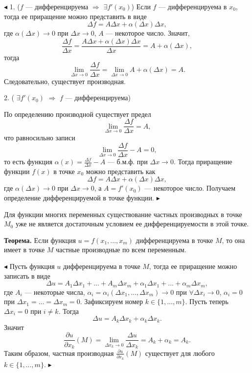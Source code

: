 \documentclass[12pt]{article}
\begin{document}
$\blacktriangleleft$ 1. ($f$ --- дифференцируема $\Rightarrow$ $\exists f'(x_0)$) Если $f$ --- дифференцируема в $x_0$, тогда ее приращение можно представить в виде 
$$
	\Delta f = A\Delta x + \alpha(\Delta x) \Delta x,
$$
где $\alpha(\Delta x) \rightarrow 0$ при $\Delta x \rightarrow 0$, $A$ --- некоторое число.
Значит, 
$$
	\frac{\Delta f}{\Delta x} = \frac{A\Delta x + \alpha(\Delta x) \Delta x}{\Delta x} = A + \alpha(\Delta x),
$$
тогда
$$
	\lim_{\Delta x \rightarrow 0} \frac{\Delta f}{\Delta x} = \lim_{\Delta x \rightarrow 0} A + \alpha(\Delta x) = A.
$$
Следовательно, существует производная. 


2. ( $\exists f'(x_0)$ $\Rightarrow$ $f$ --- дифференцируема)

По определению производной существует предел
$$
	\lim_{\Delta x \rightarrow 0} \frac{\Delta f}{\Delta x} = A,
$$
что равносильно записи
$$
	\lim_{\Delta x \rightarrow 0} \frac{\Delta f}{\Delta x} - A = 0,
$$
то есть функция $\alpha(x) = \frac{\Delta f}{\Delta x} - A$ --- б.м.ф. при $\Delta x \rightarrow 0$. Тогда приращение функции $f(x)$ в точке $x_0$ можно представить как
$$
	\Delta f = A \Delta x + \alpha(\Delta x) \Delta x, 
$$
где $\alpha(\Delta x) \rightarrow 0$ при $\Delta x \rightarrow 0$, а $A = f'(x_0)$ --- некоторое число. Получаем определение дифференцируемой в точке функции. $\blacktriangleright$

Для функции многих переменных существование частных производных в точке $M_0$ уже не является достаточным условием ее дифференцируемости в этой точке.

\textbf{Теорема.} Если функция $u = f(x_1,...,x_m)$ дифференцируема в точке $M$, то она имеет в точке $M$ частные производные по всем переменным.

$\blacktriangleleft$ Пусть функция $u$ дифференцируема в точке $M$, тогда ее приращение можно записать в виде
$$
	\Delta u = A_1\Delta x_1 + ...+ A_m \Delta x_m + \alpha_1 \Delta x_1 + ... + \alpha_m \Delta x_m,
$$
где $A_i$ --- некоторые числа, $\alpha_i = \alpha_i(\Delta x_1, ..., \Delta x_m) \rightarrow 0$ при $ \forall \Delta x_i \rightarrow 0$, $\alpha_i = 0$ при $\Delta x_1 = ... = \Delta x_m = 0$. Зафиксируем номер $k \in \{1,...,m \}$. Пусть теперь $\Delta x_i = 0$ при $i \neq k$. Тогда
$$
	\Delta u = A_k \Delta x_k + \alpha_k \Delta x_k.
$$
Значит 
$$
	\frac{\partial u}{\partial x_k}(M) = \lim_{\Delta x_k \rightarrow 0} \frac{\Delta u}{\Delta x_k} = A_k + \alpha_k = A_k.
$$
Таким образом, частная производная $\frac{\partial u}{\partial x_k}(M)$ существует для любого $k \in \{1,...,m \}$. 
$\blacktriangleright$
\end{document}
